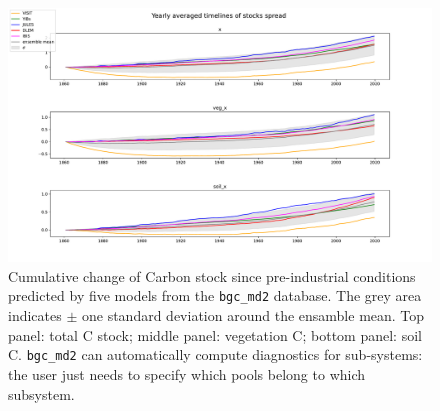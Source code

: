 \begin{figure}[t] \includegraphics[width=\columnwidth]{test_stock_mean.pdf}
  \caption{
    Cumulative change of Carbon %
    stock since pre-industrial conditions predicted by five models from the \texttt{bgc\_md2} database. The grey area indicates $\pm$ one standard deviation around the ensamble mean.
    Top panel: total C stock; middle panel: vegetation C; bottom panel: soil C.  \texttt{bgc\_md2} can automatically compute diagnostics for sub-systems: the user just needs to specify which pools
    belong to which subsystem.
  }
  \label{fig:stock_mean} 
\end{figure}  


